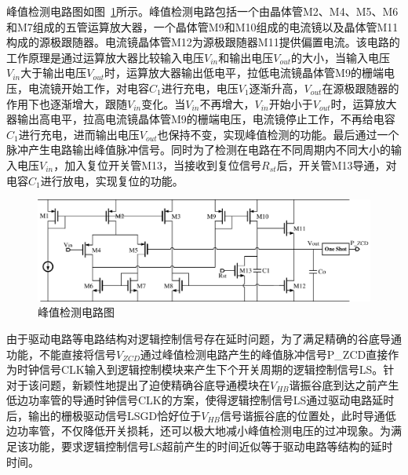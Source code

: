 峰值检测电路图如图~\ref{fig:峰值检测电路图}所示。峰值检测电路包括一个由晶体管M2、M4、M5、M6和M7组成的五管运算放大器，一个晶体管M9和M10组成的电流镜以及晶体管M11构成的源极跟随器。电流镜晶体管M12为源极跟随器M11提供偏置电流。该电路的工作原理是通过运算放大器比较输入电压$V_{in}$和输出电压$V_{out}$的大小，当输入电压$V_{in}$大于输出电压$V_{out}$时，运算放大器输出低电平，拉低电流镜晶体管M9的栅端电压，电流镜开始工作，对电容$C_1$进行充电，电压$V_1$逐渐升高，$V_{out}$在源极跟随器的作用下也逐渐增大，跟随$V_{in}$变化。当$V_{in}$不再增大，$V_{in}$开始小于$V_{out}$时，运算放大器输出高电平，拉高电流镜晶体管M9的栅端电压，电流镜停止工作，不再给电容$C_1$进行充电，进而输出电压$V_{out}$也保持不变，实现峰值检测的功能。最后通过一个脉冲产生电路输出峰值脉冲信号。同时为了检测在电路在不同周期内不同大小的输入电压$V_{in}$，加入复位开关管M13，当接收到复位信号$R_{st}$后，开关管M13导通，对电容$C_1$进行放电，实现复位的功能。

\begin{figure}[htbp] 
    \centering
    \includegraphics[width=1.0\linewidth]{figures/峰值检测电路图.pdf}
    \caption{峰值检测电路图}
    \label{fig:峰值检测电路图}
\end{figure}

由于驱动电路等电路结构对逻辑控制信号存在延时问题，为了满足精确的谷底导通功能，不能直接将信号$V_{ZCD}$通过峰值检测电路产生的峰值脉冲信号P\_ZCD直接作为时钟信号CLK输入到逻辑控制模块来产生下个开关周期的逻辑控制信号LS。针对于该问题，新颖性地提出了迫使精确谷底导通模块在$V_{HB}$谐振谷底到达之前产生低边功率管的导通时钟信号CLK的方案，使得逻辑控制信号LS通过驱动电路延时后，输出的栅极驱动信号LSGD恰好位于$V_{HB}$信号谐振谷底的位置处，此时导通低边功率管，不仅降低开关损耗，还可以极大地减小峰值检测电压的过冲现象。为满足该功能，要求逻辑控制信号LS超前产生的时间近似等于驱动电路等结构的延时时间。

